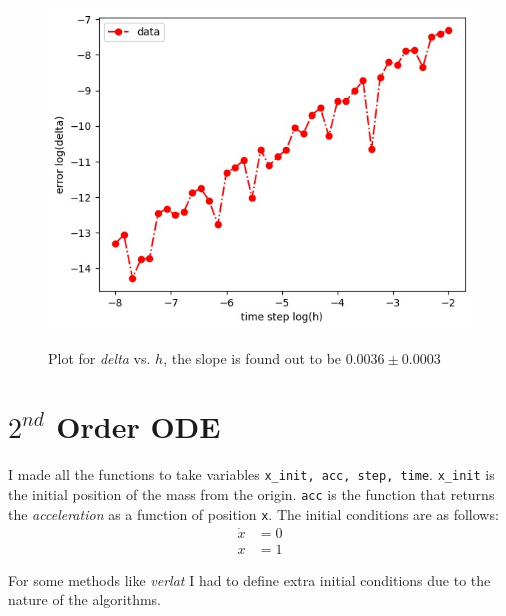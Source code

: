 \documentclass[12pt, a4paper]{article}
\begin{document}
	\begin{figure}[h!]
		\centering
		\includegraphics[width=0.8\linewidth]{../p1/error.jpg}
		\label{fig:error}
		\caption{Plot for \emph{delta} vs. \emph{$h$}, the slope is found out to be $0.0036 \pm 0.0003$}
	\end{figure}

	\section{$2^{nd}$ Order ODE}
	I made all the functions to take variables \texttt{x\_init, acc, step, time}. \texttt{x\_init} is the initial position of the mass from the origin.
	\texttt{acc} is the function that returns the \emph{acceleration} as a function of position \texttt{x}.
	The initial conditions are as follows:
	\begin{equation}
		\begin{aligned}
			\dot{x} &= 0\\
			x & = 1
		\end{aligned}
	\end{equation}
	
	For some methods like \emph{verlat} I had to define extra initial conditions due to the nature of the algorithms.
	
\end{document}
